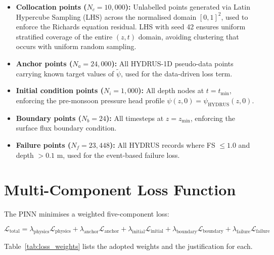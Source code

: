 \documentclass[12pt]{report}
\begin{document}
\begin{itemize}
    \item \textbf{Collocation points ($N_c = 10{,}000$):} Unlabelled
    points generated via Latin Hypercube Sampling (LHS) across the
    normalised domain $[0,1]^2$, used to enforce the Richards equation
    residual. LHS with seed 42 ensures uniform stratified coverage of
    the entire $(z,t)$ domain, avoiding clustering that occurs with
    uniform random sampling.

    \item \textbf{Anchor points ($N_a = 24{,}000$):} All HYDRUS-1D
    pseudo-data points carrying known target values of $\tilde{\psi}$,
    used for the data-driven loss term.

    \item \textbf{Initial condition points ($N_i = 1{,}000$):}
    All depth nodes at $t = t_{\min}$, enforcing the pre-monsoon
    pressure head profile $\psi(z, 0) = \psi_{\text{HYDRUS}}(z, 0)$.

    \item \textbf{Boundary points ($N_b = 24$):} All timesteps at
    $z = z_{\min}$, enforcing the surface flux boundary condition.

    \item \textbf{Failure points ($N_f = 23{,}448$):} All HYDRUS
    records where FS $\leq 1.0$ and depth $> 0.1$ m, used for the
    event-based failure loss.
\end{itemize}

\section{Multi-Component Loss Function}

The PINN minimises a weighted five-component loss:

\begin{equation}
\mathcal{L}_{\text{total}} =
  \lambda_{\text{physics}}  \mathcal{L}_{\text{physics}}  +
  \lambda_{\text{anchor}}   \mathcal{L}_{\text{anchor}}   +
  \lambda_{\text{initial}}  \mathcal{L}_{\text{initial}}  +
  \lambda_{\text{boundary}} \mathcal{L}_{\text{boundary}} +
  \lambda_{\text{failure}}  \mathcal{L}_{\text{failure}}
\end{equation}

Table~\ref{tab:loss_weights} lists the adopted weights and the
justification for each.
\end{document}
